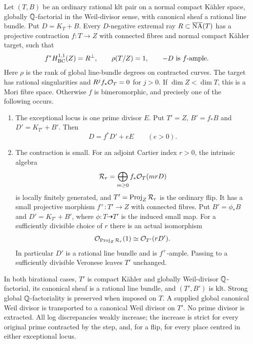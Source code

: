 \begin{proposition}\label{prop:ordinary-step}
Let $(T,B)$ be an ordinary rational klt pair on a normal compact K\"ahler
space, globally $\mathbb Q$-factorial in the Weil-divisor sense, with canonical
sheaf a rational line bundle.  Put $D=K_T+B$.  Every $D$-negative
extremal ray $R\subset\overline{\mathrm{NA}}(T)$ has a projective contraction $f:T\to Z$
with connected fibres and normal compact K\"ahler target, such that
\begin{equation}\label{eq:ordinary-negative-bc}
 f^*H^{1,1}_{\mathrm{BC}}(Z)=R^\perp,\qquad
 \rho(T/Z)=1,\qquad -D\text{ is }f\text{-ample}.
\end{equation}
Here $\rho$ is the rank of global line-bundle degrees on contracted
curves.  The target has rational singularities and
$R^j f_*\mathcal O_T=0$ for $j>0$.  If $\dim Z<\dim T$, this is a Mori fibre
space.  Otherwise $f$ is bimeromorphic, and precisely one of the
following occurs.
\begin{enumerate}[label=\textup{(\roman*)}]
\item The exceptional locus is one prime divisor $E$.  Put $T'=Z$,
$B'=f_*B$ and $D'=K_{T'}+B'$.  Then
\begin{equation}\label{eq:ordinary-divisorial-difference}
 D=f^*D'+eE\qquad(e>0).
\end{equation}
\item The contraction is small.  For an adjoint Cartier index $r>0$,
the intrinsic algebra
\begin{equation}\label{eq:ordinary-flip-algebra}
 \mathcal R_r=\bigoplus_{m\geq0}f_*\mathcal O_T(mrD)
\end{equation}
is locally finitely generated, and $T'=\operatorname{Proj}_Z\mathcal R_r$ is the ordinary
flip.  It has a small projective morphism $f^+:T'\to Z$ with connected
fibres.  Put $B'=\phi_*B$ and $D'=K_{T'}+B'$, where
$\phi:T\dashrightarrow T'$ is the induced small map.  For a sufficiently
divisible choice of $r$ there is an actual isomorphism
\begin{equation}\label{eq:ordinary-tautological}
 \mathcal O_{\operatorname{Proj}_Z\mathcal R_r}(1)\simeq\mathcal O_{T'}(rD').
\end{equation}
In particular $D'$ is a rational line bundle and is $f^+$-ample.
Passing to a sufficiently divisible Veronese leaves $T'$ unchanged.
\end{enumerate}
In both birational cases, $T'$ is compact K\"ahler and globally
Weil-divisor $\mathbb Q$-factorial, its canonical sheaf is a rational line
bundle, and $(T',B')$ is klt.  Strong global $\mathbb Q$-factoriality is
preserved when imposed on $T$.  A supplied global canonical Weil divisor
is transported to a canonical Weil divisor on $T'$.  No prime divisor is
extracted.  All log discrepancies weakly increase; the increase is strict
for every original prime contracted by the step, and, for a flip, for
every place centred in either exceptional locus.
\end{proposition}


